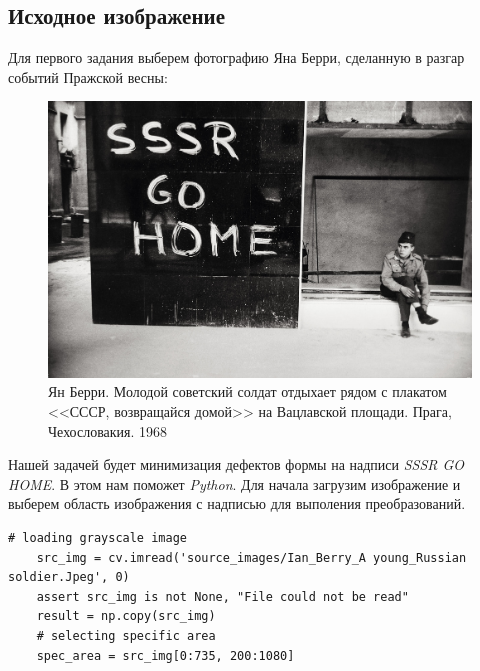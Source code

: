 \subsection{Исходное изображение}

Для первого задания выберем фотографию Яна Берри, сделанную в разгар событий Пражской весны:
\begin{figure}[ht!]
    \centering
    \includegraphics[width=\textwidth]{images/source_images/Ian_Berry_A young_Russian soldier.jpg}
    \caption{Ян Берри. Молодой советский солдат отдыхает рядом с плакатом <<СССР, возвращайся домой>> на Вацлавской площади. Прага, Чехословакия. 1968}
    \label{img:Soldier_orig}
\end{figure} 

Нашей задачей будет минимизация дефектов формы на надписи \textit{SSSR GO HOME}. В этом нам поможет \textit{Python}. Для начала загрузим изображение и выберем область изображения с надписью для выполения преобразований.

\begin{lstlisting}[caption={Исходный код для считывания изображения}, label={lst:img_reading}]
    # loading grayscale image
    src_img = cv.imread('source_images/Ian_Berry_A young_Russian soldier.Jpeg', 0)
    assert src_img is not None, "File could not be read"
    result = np.copy(src_img)
    # selecting specific area
    spec_area = src_img[0:735, 200:1080]
\end{lstlisting}

